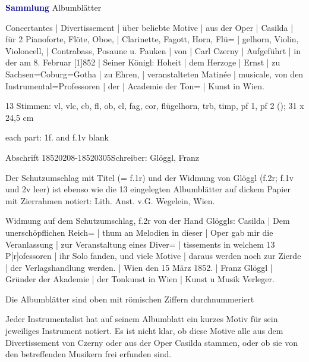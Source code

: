 \documentclass[a4paper, twocolumn, 11pt]{book}
\begin{document}
\par \vspace{16pt} \textcolor{darkblue}{\textbf{Sammlung}}\hfillplus{[78]} Albumblätter
\par \begin{itshape} Concertantes | Divertissement | über beliebte Motive | aus der Oper | Casilda | für 2 Pianoforte, Flöte, Oboe, | Clarinette, Fagott, Horn, Flü= | gelhorn, Violin, Violoncell, | Contrabass, Posaune u. Pauken | von | Carl Czerny | Aufgeführt | in der am 8. Februar [1]852 | Seiner Königl: Hoheit | dem Herzoge | Ernst | zu Sachsen=Coburg=Gotha | zu Ehren, | veranstalteten Matinée | musicale, von den Instrumental=Professoren | der | Academie der Ton= | Kunst in Wien.\end{itshape} 
\par \textcolor{darkblue}{}  13 Stimmen: vl, vlc, cb, fl, ob, cl, fag, cor, flügelhorn, trb, timp, pf 1, pf 2  (); 31 x 24,5 cm\newline \begin{small} each part: 1f. and f.1v blank\end{small} \newline Abschrift  18520208-18520305\newline Schreiber: Glöggl, Franz
\par Der Schutzumschlag mit Titel (= f.1r) und der Widmung von Glöggl (f.2r; f.1v und 2v leer) ist ebenso wie die 13 eingelegten Albumblätter auf dickem Papier mit Zierrahmen notiert: {\textquotedbl}Lith. Anst. v.G. Wegelein, Wien.{\textquotedbl}
\par Widmung auf dem Schutzumschlag, f.2r von der Hand Glöggls: Casilda | Dem unerschöpflichen Reich= | thum an Melodien in dieser | Oper gab mir die Veranlassung | zur Veranstaltung eines Diver= | tissements in welchem 13 P[r]ofessoren | ihr Solo fanden, und viele Motive | daraus werden noch zur Zierde | der Verlagshandlung werden. | Wien den 15 März 1852. | Franz Glöggl | Gründer der Akademie | der Tonkunst in Wien | Kunst u Musik Verleger.
\par Die Albumblätter sind oben mit römischen Ziffern durchnummeriert
\par Jeder Instrumentalist hat auf seinem Albumblatt ein kurzes Motiv für sein jeweiliges Instrument notiert. Es ist nicht klar, ob diese Motive alle aus dem {\textquotedbl}Divertissement{\textquotedbl} von Czerny oder aus der Oper {\textquotedbl}Casilda{\textquotedbl} stammen, oder ob sie von den betreffenden Musikern frei erfunden sind.
\end{document}
